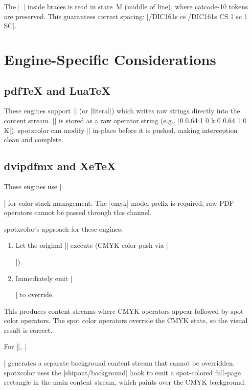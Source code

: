\documentclass[luatex]{article}
\newcommand\pkg[1]{\textsf{#1}}
\begin{document}
The |~| inside braces is read in state~M (middle of line), where catcode-10 tokens are preserved.
This guarantees correct spacing: |/DIC161s cs /DIC161s CS 1 sc 1 SC|.

\section{Engine-Specific Considerations}

\subsection{pdfTeX and LuaTeX}

These engines support |\pdfliteral| (or |\pdfextension literal|) which writes raw strings directly into the content stream.
|\current@color| is stored as a raw operator string (e.g., |0 0.64 1 0 k 0 0.64 1 0 K|).
\pkg{spotxcolor} can modify |\current@color| in-place before it is pushed, making interception clean and complete.

\subsection{dvipdfmx and XeTeX}

These engines use || for color stack management.
The |cmyk| model prefix is required; raw PDF operators cannot be passed through this channel.

\pkg{spotxcolor}'s approach for these engines:
\begin{enumerate}
\item Let the original |\set@color| execute (CMYK color push via ||).
\item Immediately emit || to override.
\end{enumerate}

This produces content streams where CMYK operators appear followed by spot color operators.
The spot color operators override the CMYK state, so the visual result is correct.

For |\pagecolor|, || generates a separate background content stream that cannot be overridden.
\pkg{spotxcolor} uses the |shipout/background| hook to emit a spot-colored full-page rectangle in the main content stream, which paints over the CMYK background.
\end{document}
